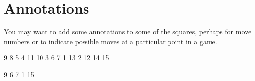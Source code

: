 \documentclass[a4paper,12pt]{article}
\begin{document}
\section{Annotations}
You may want to add some annotations to some of the squares, perhaps for move numbers or to indicate possible moves at a particular point in a game.\\
\begin{minipage}[t]{212pt}
\vspace{0pt}
\begin{othelloboard}{1}
\dotmarkings
{}
\annotationsfirstrow		{}	{}	{}	{}	{}	{}	{}	{}
\annotationssecondrow	{}	{}	{9}	{}	{}	{}	{}	{}
\annotationsthirdrow		{}	{8}	{5}	{4}	{11}	{}	{}	{}
\annotationsfourthrow	{}	{10}	{3}	{}	{}	{6}	{}	{}
\annotationsfifthrow		{}	{}	{7}	{}	{}	{1}	{}	{}
\annotationssixthrow		{}	{}	{13}	{2}	{12}	{14}	{}	{}
\annotationsseventhrow	{}	{}	{}	{}	{15}	{}	{}	{}
\annotationseighthrow	{}	{}	{}	{}	{}	{}	{}	{}
\end{othelloboard}
\end{minipage}
\begin{minipage}[t]{248pt}
\vspace{8pt}
\begin{footnotesize}
\begin{verbatimtab}
\begin{othelloboard}{1}
\dotmarkings
{}
\annotationssecondrow	{} {} {9}{} {} {} {} {}
 {} {}
 {} {6}{} {}
\annotationsfifthrow	{} {} {7}{} {} {1}{} {}
\annotationsseventhrow	{} {} {} {}{15}{} {} {}
\end{othelloboard}
\end{verbatimtab}
\end{footnotesize}
\end{minipage}
\ \\
\end{document}
